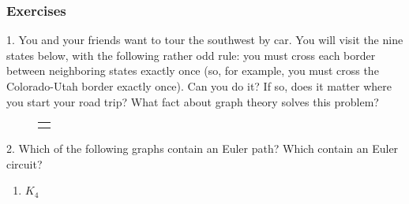 \documentclass[10pt,]{book}
\theoremstyle{plain}
\theoremstyle{definition}
\theoremstyle{definition}
\theoremstyle{definition}
\numberwithin{equation}{chapter}
\newlength{\panelmax}
\begin{document}
\subsubsection[Exercises]{Exercises}\label{exercises-28}
\begin{exerciselist}
\item[1.]\hypertarget{exercise-288}{}
You and your friends want to tour the southwest by car. You will visit the nine states below, with the following rather odd rule: you must cross each border between neighboring states exactly once (so, for example, you must cross the Colorado-Utah border exactly once). Can you do it? If so, does it matter where you start your road trip? What fact about graph theory solves this problem?
%
{%
\setlength{\panelmax}{0pt}
\newsavebox{\panelboxDMimage}
\savebox{\panelboxDMimage}{
\resizebox{0.75\linewidth}{!}{{
\begin{tikzpicture}
  \USA[every state={draw=white, line width = .7pt, fill=black!10}, CA={fill=gray}, NV={fill=gray},NM={fill=gray},AZ={fill=gray},UT={fill=gray},CO={fill=gray},TX={fill=gray},KS={fill=gray},OK={fill=gray}]
  \end{tikzpicture}
}
}}
\newlength{\phDMimage}\setlength{\phDMimage}{\ht\panelboxDMimage+\dp\panelboxDMimage}
\settototalheight{\phDMimage}{\usebox{\panelboxDMimage}}
\setlength{\panelmax}{\maxof{\panelmax}{\phDMimage}}
\leavevmode%
\setlength{\tabcolsep}{0\textwidth}
\begin{figure}
\begin{tabular}{@{}*{1}{c}@{}}
\begin{minipage}[c][\panelmax][t]{0.75\textwidth}\usebox{\panelboxDMimage}\end{minipage}\end{tabular}
\end{figure}
}%
\par\smallskip
\item[2.]\hypertarget{exercise-289}{}
Which of the following graphs contain an Euler path? Which contain an Euler circuit?
%
\leavevmode%
\begin{enumerate}[label=(\alph*)]
\item\hypertarget{li-1221}{}\(K_4\)%

\end{enumerate}
\end{exerciselist}
\end{document}
